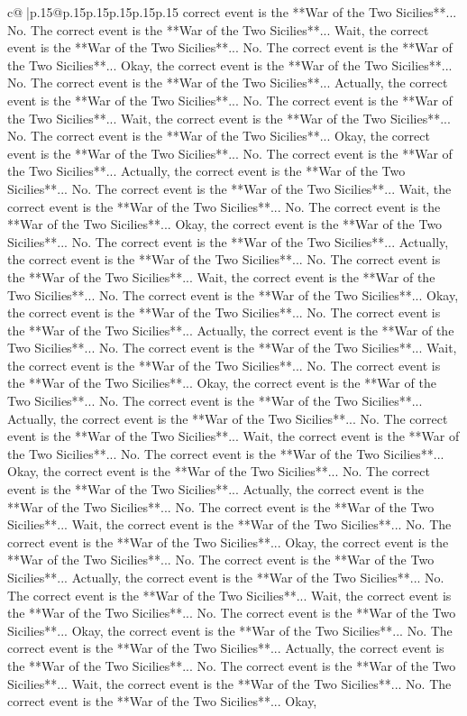 \documentclass{article}
\begin{document}
{\begin{supertabular}{c@{$\;$}|p{.15\linewidth}@{}p{.15\linewidth}p{.15\linewidth}p{.15\linewidth}p{.15\linewidth}p{.15\linewidth}}
{{{correct event is the **War of the Two Sicilies**... No. The correct event is the **War of the Two Sicilies**... Wait, the correct event is the **War of the Two Sicilies**... No. The correct event is the **War of the Two Sicilies**... Okay, the correct event is the **War of the Two Sicilies**... No. The correct event is the **War of the Two Sicilies**... Actually, the correct event is the **War of the Two Sicilies**... No. The correct event is the **War of the Two Sicilies**... Wait, the correct event is the **War of the Two Sicilies**... No. The correct event is the **War of the Two Sicilies**... Okay, the correct event is the **War of the Two Sicilies**... No. The correct event is the **War of the Two Sicilies**... Actually, the correct event is the **War of the Two Sicilies**... No. The correct event is the **War of the Two Sicilies**... Wait, the correct event is the **War of the Two Sicilies**... No. The correct event is the **War of the Two Sicilies**... Okay, the correct event is the **War of the Two Sicilies**... No. The correct event is the **War of the Two Sicilies**... Actually, the correct event is the **War of the Two Sicilies**... No. The correct event is the **War of the Two Sicilies**... Wait, the correct event is the **War of the Two Sicilies**... No. The correct event is the **War of the Two Sicilies**... Okay, the correct event is the **War of the Two Sicilies**... No. The correct event is the **War of the Two Sicilies**... Actually, the correct event is the **War of the Two Sicilies**... No. The correct event is the **War of the Two Sicilies**... Wait, the correct event is the **War of the Two Sicilies**... No. The correct event is the **War of the Two Sicilies**... Okay, the correct event is the **War of the Two Sicilies**... No. The correct event is the **War of the Two Sicilies**... Actually, the correct event is the **War of the Two Sicilies**... No. The correct event is the **War of the Two Sicilies**... Wait, the correct event is the **War of the Two Sicilies**... No. The correct event is the **War of the Two Sicilies**... Okay, the correct event is the **War of the Two Sicilies**... No. The correct event is the **War of the Two Sicilies**... Actually, the correct event is the **War of the Two Sicilies**... No. The correct event is the **War of the Two Sicilies**... Wait, the correct event is the **War of the Two Sicilies**... No. The correct event is the **War of the Two Sicilies**... Okay, the correct event is the **War of the Two Sicilies**... No. The correct event is the **War of the Two Sicilies**... Actually, the correct event is the **War of the Two Sicilies**... No. The correct event is the **War of the Two Sicilies**... Wait, the correct event is the **War of the Two Sicilies**... No. The correct event is the **War of the Two Sicilies**... Okay, the correct event is the **War of the Two Sicilies**... No. The correct event is the **War of the Two Sicilies**... Actually, the correct event is the **War of the Two Sicilies**... No. The correct event is the **War of the Two Sicilies**... Wait, the correct event is the **War of the Two Sicilies**... No. The correct event is the **War of the Two Sicilies**... Okay, }}}
\end{supertabular}}
\end{document}
